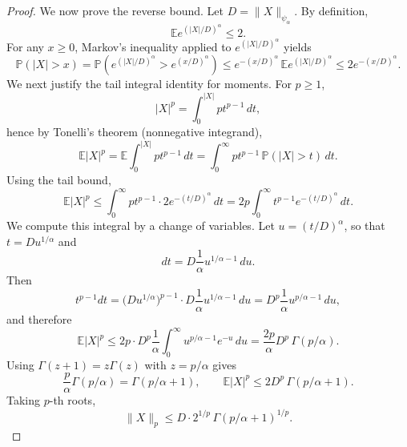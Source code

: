 \documentclass[12pt]{article}
\renewcommand{\(}{\left(}%
\renewcommand{\)}{\right)}%
\renewcommand{\[}{\left[}%
\renewcommand{\]}{\right]}%
\newtheorem{proof}{Proof.}}
\begin{document}
\begin{proof}
\medskip
We now prove the reverse bound. Let $D=\|X\|_{\psi_\alpha}$. By definition,
\begin{equation*}
\mathbb{E}e^{(|X|/D)^\alpha}\le 2.
\end{equation*}
For any $x\ge 0$, Markov's inequality applied to $e^{(|X|/D)^\alpha}$ yields
\begin{equation*}
\mathbb{P}(|X|>x)
=\mathbb{P}\!\left(e^{(|X|/D)^\alpha}>e^{(x/D)^\alpha}\right)
\le e^{-(x/D)^\alpha}\,\mathbb{E}e^{(|X|/D)^\alpha}
\le 2e^{-(x/D)^\alpha}.
\end{equation*}
We next justify the tail integral identity for moments. For $p\ge 1$,
\begin{equation*}
|X|^p=\int_0^{|X|} p t^{p-1}\,dt,
\end{equation*}
hence by Tonelli's theorem (nonnegative integrand),
\begin{equation*}
\mathbb{E}|X|^p
=\mathbb{E}\int_0^{|X|} p t^{p-1}\,dt
=\int_0^\infty p t^{p-1}\,\mathbb{P}(|X|>t)\,dt.
\end{equation*}
Using the tail bound,
\begin{equation*}
\mathbb{E}|X|^p
\le \int_0^\infty p t^{p-1}\cdot 2e^{-(t/D)^\alpha}\,dt
=2p\int_0^\infty t^{p-1}e^{-(t/D)^\alpha}\,dt.
\end{equation*}
We compute this integral by a change of variables. Let $u=(t/D)^\alpha$, so that $t= D u^{1/\alpha}$ and
\begin{equation*}
dt = D\frac{1}{\alpha}u^{1/\alpha-1}\,du.
\end{equation*}
Then
\begin{equation*}
t^{p-1}dt
=\big(D u^{1/\alpha}\big)^{p-1}\cdot D\frac{1}{\alpha}u^{1/\alpha-1}\,du
= D^p\frac{1}{\alpha}u^{p/\alpha-1}\,du,
\end{equation*}
and therefore
\begin{equation*}
\mathbb{E}|X|^p
\le 2p\cdot D^p\frac{1}{\alpha}\int_0^\infty u^{p/\alpha-1}e^{-u}\,du
=\frac{2p}{\alpha}D^p\,\Gamma(p/\alpha).
\end{equation*}
Using $\Gamma(z+1)=z\Gamma(z)$ with $z=p/\alpha$ gives
\begin{equation*}
\frac{p}{\alpha}\Gamma(p/\alpha)=\Gamma(p/\alpha+1),
\qquad
\mathbb{E}|X|^p\le 2D^p\,\Gamma(p/\alpha+1).
\end{equation*}
Taking $p$-th roots,
\begin{equation*}
\|X\|_p\le D\cdot 2^{1/p}\,\Gamma(p/\alpha+1)^{1/p}.
\end{equation*}


\end{proof}
\end{document}
